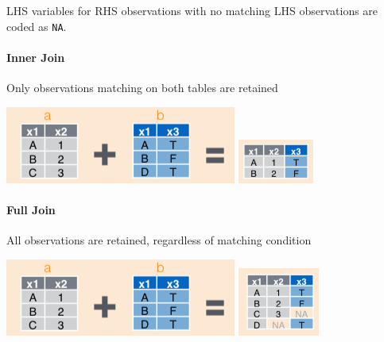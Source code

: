 \documentclass[]{article}
\newenvironment{Shaded}{\begin{snugshade}}{\end{snugshade}}
\newcommand{\KeywordTok}[1]{\textcolor[rgb]{0.13,0.29,0.53}{\textbf{{#1}}}}
\newcommand{\DataTypeTok}[1]{\textcolor[rgb]{0.13,0.29,0.53}{{#1}}}
\newcommand{\StringTok}[1]{\textcolor[rgb]{0.31,0.60,0.02}{{#1}}}
\newcommand{\NormalTok}[1]{{#1}}
\theoremstyle{definition}
\theoremstyle{definition}
\theoremstyle{remark}
\begin{document}
\begin{Shaded}
\end{Shaded}

LHS variables for RHS observations with no matching LHS observations are
coded as \texttt{NA}.

\paragraph{Inner Join}\label{inner-join}

Only observations matching on both tables are retained

\includegraphics{img/join_lhs.png} \includegraphics{img/inner_join.png}

\begin{Shaded}
\end{Shaded}

\paragraph{Full Join}\label{full-join}

All observations are retained, regardless of matching condition

\includegraphics{img/join_lhs.png} \includegraphics{img/full_join.png}
\end{document}
